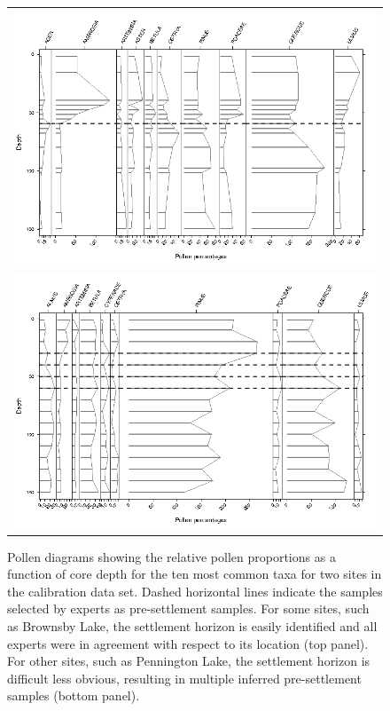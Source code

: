\begin{figure}
\centering
\begin{tabular}{c}
\includegraphics[width=6in]{figures/BROWNSBY_314.png} \\
\includegraphics[width=6in]{figures/PENNINGT_1884.png}
\end{tabular}
\caption{Pollen diagrams showing the relative pollen proportions as a
  function of core depth for the ten most common taxa for two sites in
  the calibration data set. Dashed horizontal lines indicate the
  samples selected by experts as pre-settlement samples. For some
  sites, such as Brownsby Lake, the settlement horizon is easily
  identified and all experts were in agreement with respect to its
  location (top panel). For other sites, such as Pennington Lake, the
  settlement horizon is difficult less obvious, resulting in multiple
  inferred pre-settlement samples (bottom panel).}
\label{fig:elicit}
\end{figure}


